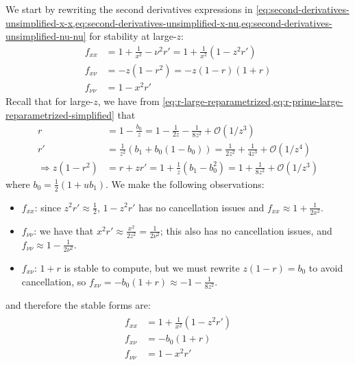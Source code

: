 \documentclass{article}
\begin{document}
We start by rewriting the second derivatives expressions in \cref{eq:second-derivatives-unsimplified-x-x,eq:second-derivatives-unsimplified-x-nu,eq:second-derivatives-unsimplified-nu-nu} for stability at large-$z$:
%
\begin{align}
  f_{xx}     & = 1 + \frac{1}{x^2} - \nu^2 r' = 1 + \frac{1}{x^2}(1 - z^2 r') \\
  f_{x\nu}   & = -z(1 - r^2) = -z (1 - r) (1 + r)                             \\
  f_{\nu\nu} & = 1 - x^2 r'
\end{align}
%
Recall that for large-$z$, we have from \cref{eq:r-large-reparametrized,eq:r-prime-large-reparametrized-simplified} that
\begin{align}
  r                      & = 1 - \frac{b_0}{z} = 1 - \frac{1}{2z} - \frac{1}{8z^2} + \mathcal{O}(1/z^3)                \\
  r'                     & = \frac{1}{z^2} (b_1 + b_0(1 - b_0)) = \frac{1}{2z^2} + \frac{1}{4z^3} + \mathcal{O}(1/z^4) \\
  \Rightarrow z(1 - r^2) & = r + z r' = 1 + \frac{1}{z} (b_1 - b_0^2) = 1 + \frac{1}{8z^2} + \mathcal{O}(1/z^3)
\end{align}
where $b_0 = \frac{1}{2} (1 + u b_1)$.
%
We make the following observations:
%
\begin{itemize}
  \item $f_{xx}$: since $z^2 r' \approx \frac{1}{2}$, $1 - z^2 r'$ has no cancellation issues and $f_{xx} \approx 1 + \frac{1}{2x^2}$.
  \item $f_{\nu\nu}$: we have that $x^2 r' \approx \frac{x^2}{2z^2} = \frac{1}{2\nu^2}$; this also has no cancellation issues, and $f_{\nu\nu} \approx 1 - \frac{1}{2\nu^2}$.
  \item $f_{x\nu}$: $1 + r$ is stable to compute, but we must rewrite $z(1 - r) = b_0$ to avoid cancellation, so $f_{x\nu} = -b_0(1 + r) \approx -1 - \frac{1}{8z^2}$.
\end{itemize}
%
and therefore the stable forms are:
%
\begin{align}\label{eq:second-derivatives-large-z}
  \boxed{
    \begin{aligned}
      f_{xx}     & = 1 + \frac{1}{x^2}(1 - z^2 r') \\
      f_{x\nu}   & = -b_0 (1 + r)                  \\
      f_{\nu\nu} & = 1 - x^2 r'
    \end{aligned}
  }
\end{align}
\end{document}
